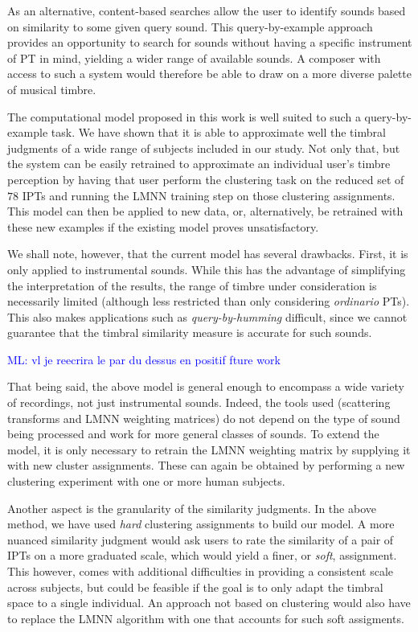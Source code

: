 \documentclass{bmcart}
\newcommand{\ml}[1]{\textcolor{blue}{ML: #1}}
\begin{document}
As an alternative, content-based searches allow the user to identify sounds based on similarity to some given query sound.
This query-by-example approach provides an opportunity to search for sounds without having a specific instrument of PT in mind, yielding a wider range of available sounds.
A composer with access to such a system would therefore be able to draw on a more diverse palette of musical timbre.

The computational model proposed in this work is well suited to such a query-by-example task.
We have shown that it is able to approximate well the timbral judgments of a wide range of subjects included in our study.
Not only that, but the system can be easily retrained to approximate an individual user's timbre perception by having that user perform the clustering task on the reduced set of $78$ IPTs and running the LMNN training step on those clustering assignments.
This model can then be applied to new data, or, alternatively, be retrained with these new examples if the existing model proves unsatisfactory.

We shall note, however, that the current model has several drawbacks.
First, it is only applied to instrumental sounds.
While this has the advantage of simplifying the interpretation of the results, the range of timbre under consideration is necessarily limited (although less restricted than only considering \emph{ordinario} PTs).
This also makes applications such as \emph{query-by-humming} difficult, since we cannot guarantee that the timbral similarity measure is accurate for such sounds.

\ml{vl je reecrira le par du dessus en positif fture work}

That being said, the above model is general enough to encompass a wide variety of recordings, not just instrumental sounds.
Indeed, the tools used (scattering transforms and LMNN weighting matrices) do not depend on the type of sound being processed and work for more general classes of sounds.
To extend the model, it is only necessary to retrain the LMNN weighting matrix by supplying it with new cluster assignments.
These can again be obtained by performing a new clustering experiment with one or more human subjects.

Another aspect is the granularity of the similarity judgments.
In the above method, we have used \emph{hard} clustering assignments to build our model.
A more nuanced similarity judgment would ask users to rate the similarity of a pair of IPTs on a more graduated scale, which would yield a finer, or \emph{soft}, assignment.
This however, comes with additional difficulties in providing a consistent scale across subjects, but could be feasible if the goal is to only adapt the timbral space to a single individual.
An approach not based on clustering would also have to replace the LMNN algorithm with one that accounts for such soft assigments.
\end{document}
